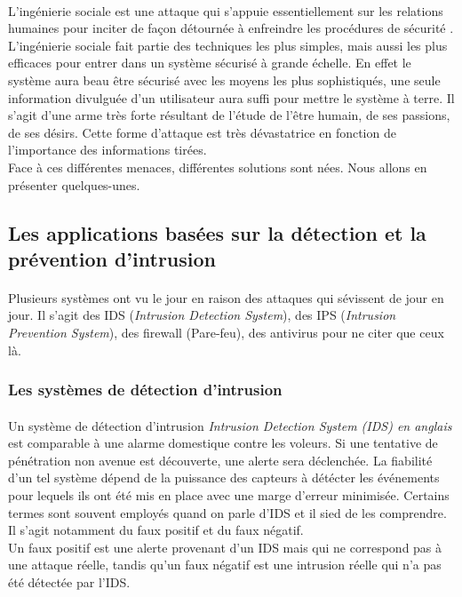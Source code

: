 	  \paragraph{}
	  L'ingénierie sociale est une attaque qui s'appuie essentiellement sur les relations humaines pour inciter de façon détournée à enfreindre les procédures de sécurité \cite{social}. L’ingénierie sociale fait partie des techniques les plus simples, mais aussi les plus efficaces pour entrer dans un système sécurisé à grande échelle. En effet le système aura beau être sécurisé avec les moyens les plus sophistiqués, une seule information divulguée d'un utilisateur aura suffi pour mettre le système à terre. Il s'agit d'une arme très forte résultant de l'étude de l'être humain, de ses passions, de ses désirs. Cette forme d'attaque est très dévastatrice en fonction de l'importance des informations tirées.\\
	  Face à ces différentes menaces, différentes solutions sont nées. Nous allons en présenter quelques-unes.
		        	    
    \subsection{Les applications basées sur la détection et la prévention d'intrusion}
      \paragraph{}
	Plusieurs systèmes ont vu le jour en raison des attaques qui sévissent de jour en jour. Il s'agit des IDS (\textit{Intrusion Detection System}), des IPS (\textit{Intrusion Prevention System}), des firewall (Pare-feu), des antivirus pour ne citer que ceux là.
	
      \subsubsection{Les systèmes de détection d'intrusion}
	\paragraph{}
	  Un système de détection d’intrusion \textit{Intrusion Detection System (IDS) en anglais} est comparable à une alarme domestique contre les voleurs. Si une tentative de pénétration non avenue est découverte, une alerte sera déclenchée.
	  La fiabilité d'un tel système dépend de la puissance des capteurs à détécter les événements pour lequels ils ont été mis en place avec une marge d'erreur minimisée. 
	  Certains termes sont souvent employés quand on parle d’IDS et il sied de les  comprendre. Il s'agit notamment du faux positif et du faux négatif.\\
	  Un faux positif est une alerte provenant d’un IDS mais qui ne correspond pas à une attaque réelle, tandis qu'un faux négatif est une intrusion réelle qui n’a pas été détectée par l’IDS.

